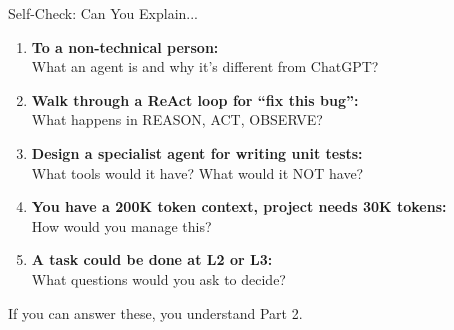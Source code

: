 \documentclass[aspectratio=169, 11pt]{beamer}
\begin{document}
\begin{frame}{Self-Check: Can You Explain...}
    \begin{enumerate}
        \item \textbf{To a non-technical person:}\\
        What an agent is and why it's different from ChatGPT?

        \item \textbf{Walk through a ReAct loop for ``fix this bug'':}\\
        What happens in REASON, ACT, OBSERVE?

        \item \textbf{Design a specialist agent for writing unit tests:}\\
        What tools would it have? What would it NOT have?

        \item \textbf{You have a 200K token context, project needs 30K tokens:}\\
        How would you manage this?

        \item \textbf{A task could be done at L2 or L3:}\\
        What questions would you ask to decide?
    \end{enumerate}

    \vspace{0.5cm}
    \begin{alertblock}{}
        \centering
        If you can answer these, you understand Part 2.
    \end{alertblock}

\end{frame}
\end{document}
